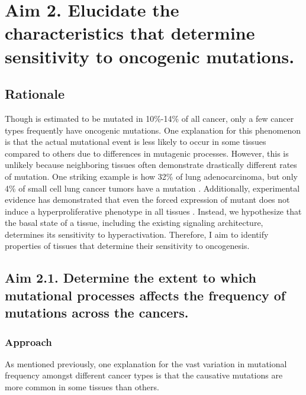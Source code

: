 \section{Aim 2. Elucidate the characteristics that determine sensitivity to oncogenic \KRAS{} mutations.}

\subsection*{Rationale}

Though \KRAS{} is estimated to be mutated in 10\%-14\% \cite{Bailey2018, Prior2020TheCancer} of all cancer, only a few cancer types frequently have oncogenic \KRAS{} mutations.
One explanation for this phenomenon is that the actual mutational event is less likely to occur in some tissues compared to others due to differences in mutagenic processes.
However, this is unlikely because neighboring tissues often demonstrate drastically different rates of \KRAS{} mutation.
One striking example is how 32\% of lung adenocarcinoma, but only 4\% of small cell lung cancer tumors have a \KRAS{} mutation \cite{Bailey2018, Prior2020TheCancer}.
Additionally, experimental evidence has demonstrated that even the forced expression of mutant \kras{} does not induce a hyperproliferative phenotype in all tissues \cite{Ray2011EpithelialModel,  Parikh2012MouseResponses}.
Instead, we hypothesize that the basal state of a tissue, including the existing signaling architecture, determines its sensitivity to \KRAS{} hyperactivation.
Therefore, I aim to identify properties of tissues that determine their sensitivity to \KRAS{} oncogenesis.


\subsection*{Aim 2.1. Determine the extent to which mutational processes affects the frequency of \KRAS{} mutations across the cancers.}

\subsubsection*{Approach}

As mentioned previously, one explanation for the vast variation in \KRAS{} mutational frequency amongst different cancer types is that the causative mutations are more common in some tissues than others.

